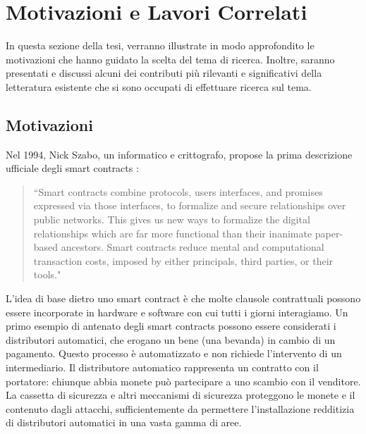 \documentclass[../../Thesis.tex]{subfiles}
\begin{document}
\chapter{Motivazioni e Lavori Correlati}
In questa sezione della tesi, verranno illustrate in modo approfondito le motivazioni che hanno guidato la scelta del tema di ricerca. Inoltre, saranno presentati e discussi alcuni dei contributi pi\`u rilevanti e significativi della letteratura esistente che si sono occupati di effettuare ricerca sul tema.

\section{Motivazioni}
\label{ch:motivations}

Nel 1994, Nick Szabo, un informatico e crittografo, propose la prima descrizione ufficiale degli smart contracts \cite{Szabo_1997}:
 \begin{quotation}
    ``Smart contracts combine protocols, users interfaces, and promises expressed via those interfaces, to formalize and secure relationships over public networks. This gives us new ways to formalize the digital relationships which are far more functional than their inanimate paper-based ancestors. Smart contracts reduce mental and computational transaction costs, imposed by either principals, third parties, or their tools."
 \end{quotation}
L'idea di base dietro uno smart contract \`e che molte clausole contrattuali possono essere incorporate in hardware e software con cui tutti i giorni interagiamo. Un primo esempio di antenato degli smart contracts possono essere considerati i distributori automatici, che erogano un bene (una bevanda) in cambio di un pagamento. Questo processo \`e automatizzato e non richiede l'intervento di un intermediario. Il distributore automatico rappresenta un contratto con il portatore: chiunque abbia monete pu\`o partecipare a uno scambio con il venditore. La cassetta di sicurezza e altri meccanismi di sicurezza proteggono le monete e il contenuto dagli attacchi, sufficientemente da permettere l'installazione redditizia di distributori automatici in una vasta gamma di aree.
\end{document}
